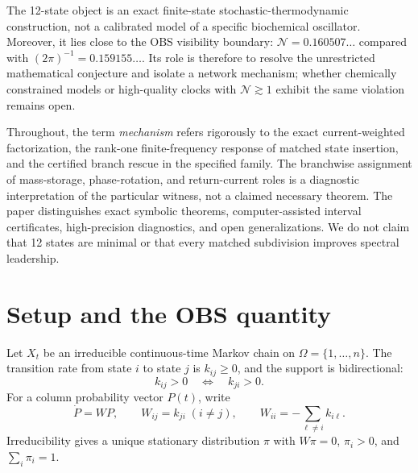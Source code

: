 \documentclass[aps,pre,reprint,groupedaddress,nofootinbib,showkeys,floatfix]{revtex4-2}
\newcommand{\Ncoh}{\mathcal N}
\begin{document}
The 12-state object is an exact finite-state stochastic-thermodynamic construction, not a calibrated model of a specific biochemical oscillator. Moreover, it lies close to the OBS visibility boundary: $\Ncoh=0.160507\ldots$ compared with $(2\pi)^{-1}=0.159155\ldots$. Its role is therefore to resolve the unrestricted mathematical conjecture and isolate a network mechanism; whether chemically constrained models or high-quality clocks with $\Ncoh\gtrsim1$ exhibit the same violation remains open.

Throughout, the term \emph{mechanism} refers rigorously to the exact current-weighted factorization, the rank-one finite-frequency response of matched state insertion, and the certified branch rescue in the specified family. The branchwise assignment of mass-storage, phase-rotation, and return-current roles is a diagnostic interpretation of the particular witness, not a claimed necessary theorem. The paper distinguishes exact symbolic theorems, computer-assisted interval certificates, high-precision diagnostics, and open generalizations. We do not claim that 12 states are minimal or that every matched subdivision improves spectral leadership.

\section{Setup and the OBS quantity}
Let $X_t$ be an irreducible continuous-time Markov chain on $\Omega=\{1,\ldots,n\}$. The transition rate from state $i$ to state $j$ is $k_{ij}\ge0$, and the support is bidirectional:
\begin{equation}
k_{ij}>0\quad\Longleftrightarrow\quad k_{ji}>0.
\end{equation}
For a column probability vector $P(t)$, write
\begin{equation}
\dot P=WP,\qquad W_{ij}=k_{ji}\;(i\ne j),\qquad W_{ii}=-\sum_{\ell\ne i}k_{i\ell}.
\end{equation}
Irreducibility gives a unique stationary distribution $\pi$ with $W\pi=0$, $\pi_i>0$, and $\sum_i\pi_i=1$.
\end{document}
